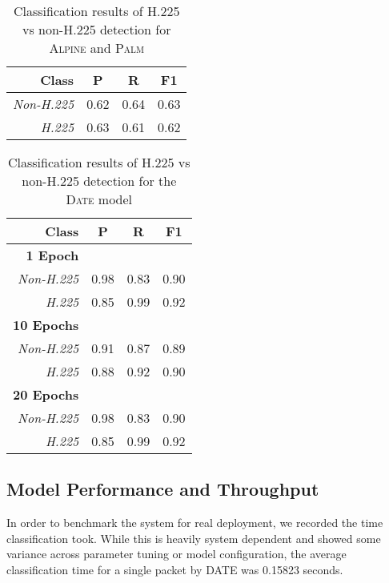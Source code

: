 \begin{table} [h!]
\centering
\begin{tabular}{| r | c | c | c |}
\hline
Class & P & R & F1 \\
\hline
\textit{Non-H.225} & 0.62 & 0.64 & 0.63 \\
\textit{H.225} & 0.63 & 0.61 & 0.62 \\
\hline
\end{tabular}
\caption{Classification results of H.225 vs non-H.225 detection for
\textsc{Alpine} and \textsc{Palm}}
\label{tab:h225resultslsh}
\end{table}


\begin{table} [h!]
\centering
\begin{tabular}{| r | c | c | c |}
\hline
Class & P & R & F1 \\
\hline
\textbf{1 Epoch} &&& \\
\textit{Non-H.225} & 0.98 & 0.83 & 0.90 \\
\textit{H.225} & 0.85 & 0.99 & 0.92 \\
\hline
\textbf{10 Epochs} &&& \\
\textit{Non-H.225} & 0.91 & 0.87 & 0.89 \\
\textit{H.225} & 0.88 & 0.92 & 0.90 \\
\hline
\textbf{20 Epochs} &&& \\
\textit{Non-H.225} & 0.98 & 0.83 & 0.90 \\
\textit{H.225} & 0.85 & 0.99 & 0.92 \\
\hline
\end{tabular}
\caption{Classification results of H.225 vs non-H.225 detection for the \textsc{Date} model}
\label{tab:h225results}
\end{table}

\subsection{Model Performance and Throughput}
In order to benchmark the system for real deployment, we recorded the time classification took. While this is heavily system dependent and showed some variance across parameter tuning or model configuration, the average classification time for a single packet by \textsc{DATE} was 0.15823 seconds.
